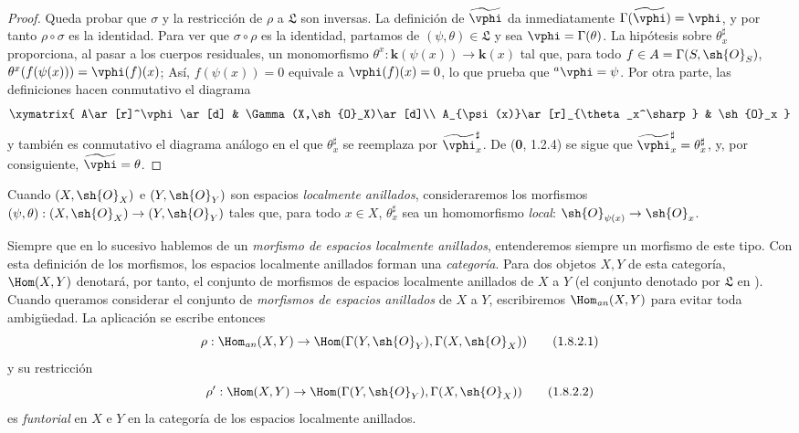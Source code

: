 \begin{proof}
Queda probar que $\sigma$ y la restricción de $\rho$ a $\mathfrak L$
son inversas. La definición de $\widetilde{\vphi}$ da inmediatamente
$\Gamma(\widetilde{\vphi})=\vphi$, y por tanto $\rho\circ\sigma$ es la
identidad. Para ver que $\sigma\circ\rho$ es la identidad, partamos de
$(\psi,\theta)\in\mathfrak L$ y sea $\vphi=\Gamma(\theta)$. La
hipótesis sobre $\theta_x^\sharp$ proporciona, al pasar a los cuerpos
residuales, un monomorfismo
$\theta^x:\boldsymbol{k}(\psi(x))\to\boldsymbol{k}(x)$
tal que, para todo $f\in A=\Gamma(S,\sh{O}_S)$,
$\theta^x(f(\psi(x)))=\vphi(f)(x)$;
Así, $f(\psi(x))=0$ equivale a $\vphi(f)(x)=0$, lo que prueba que
${}^a\vphi=\psi$. Por otra parte, las definiciones hacen conmutativo
el diagrama
\[
  \xymatrix{
    A\ar[r]^\vphi\ar[d] &
    \Gamma(X,\sh{O}_X)\ar[d]\\
    A_{\psi(x)}\ar[r]_{\theta_x^\sharp} &
    \sh{O}_x
  }
\]
y también es conmutativo el diagrama análogo en el que
$\theta_x^\sharp$ se reemplaza por $\widetilde{\vphi}_x^\sharp$. De
(\textbf 0, 1.2.4) se sigue que
$\widetilde{\vphi}_x^\sharp=\theta_x^\sharp$, y, por consiguiente,
$\widetilde{\vphi}=\theta$.
\end{proof}

\begin{env}[1.8.2]
\label{ega2:addendum:I.1.8.2-fr}
Cuando $(X,\sh{O}_X)$ e $(Y,\sh{O}_Y)$ son espacios \emph{localmente
anillados}, consideraremos los morfismos
$(\psi,\theta):(X,\sh{O}_X)\to(Y,\sh{O}_Y)$ tales que, para todo
$x\in X$, $\theta_x^\sharp$ sea un homomorfismo \emph{local}: $\sh{O}_{\psi(x)}\to\sh{O}_x$.

Siempre que en lo sucesivo hablemos de un
\emph{morfismo de espacios localmente anillados}, entenderemos siempre
un morfismo de este tipo. Con esta definición de los morfismos, los
espacios localmente anillados forman una \emph{categoría}. Para dos objetos
$X,Y$ de esta categoría, $\Hom(X,Y)$ denotará, por tanto, el conjunto
de morfismos de espacios localmente anillados de $X$ a $Y$ (el
conjunto denotado por $\mathfrak L$ en ). Cuando queramos
considerar el conjunto de \emph{morfismos de espacios anillados} de $X$ a
$Y$, escribiremos $\Hom_{\mathit{an}}(X,Y)$ para evitar toda
ambigüedad. La aplicación  se escribe entonces
\begin{equation}
\label{ega2:addendum:I.1.8.2.1-fr}
  \rho:\Hom_{\mathit{an}}(X,Y)
  \to\Hom(\Gamma(Y,\sh{O}_Y),\Gamma(X,\sh{O}_X))
\tag{1.8.2.1}
\end{equation}
y su restricción
\begin{equation}
\label{ega2:addendum:I.1.8.2.2-fr}
  \rho':\Hom(X,Y)
  \to\Hom(\Gamma(Y,\sh{O}_Y),\Gamma(X,\sh{O}_X))
\tag{1.8.2.2}
\end{equation}
es \emph{funtorial} en $X$ e $Y$ en la categoría de los espacios localmente
anillados.
\end{env}

